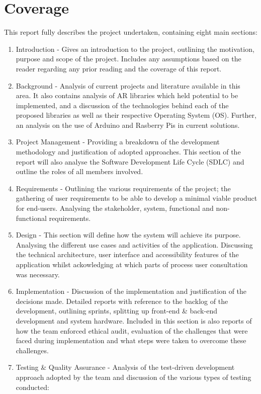 \section{Coverage}
This report fully describes the project undertaken, containing eight main sections:

\begin{enumerate}
	\item Introduction - Gives an introduction to the project, outlining the motivation, purpose and scope of the project.  Includes any assumptions based on the reader regarding any prior reading and the coverage of this report.
	\item Background - Analysis of current projects and literature available in this area. It also contains analysis of AR libraries which held potential to be implemented, and a discussion of the technologies behind each of the proposed libraries as well as their respective Operating System (OS). Further, an analysis on the use of Arduino and Rasberry Pis in current solutions.
	\item Project Management - Providing a breakdown of the development methodology and justification of adopted approaches. This section of the report will also analyse the Software Development Life Cycle (SDLC) and outline the roles of all members involved.
	\item Requirements - Outlining the various requirements of the project; the gathering of user requirements to be able to develop a minimal viable product for end-users. Analysing the stakeholder, system, functional and non-functional requirements.
	\item Design - This section will define how the system will achieve its purpose. Analysing the different use cases and activities of the application. Discussing the technical architecture, user interface and accessibility features of the application whilst ackowledging at which parts of process user consultation was necessary.
	\item Implementation - Discussion of the implementation and justification of the decisions made. Detailed reports with reference to the backlog of the development, outlining sprints, splitting up front-end \& back-end development and system hardware. Included in this section is also reports of how the team enforced ethical audit, evaluation of the challenges that were faced during implementation and what steps were taken to overcome these challenges.
	\item Testing \& Quality Assurance - Analysis of the test-driven development approach adopted by the team and discussion of the various types of testing conducted:

\end{enumerate}
